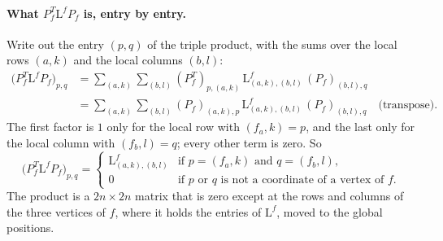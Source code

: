 \paragraph{What $P_f^T\mathrm L^f P_f$ is, entry by entry.} Write out the entry $(p, q)$ of the triple product, with the sums over the local rows $(a, k)$ and the local columns $(b, l)$:
\begin{align*}
\big(P_f^T\mathrm L^f P_f\big)_{p,q} &= \sum_{(a,k)}\sum_{(b,l)} (P_f^T)_{p,(a,k)}\, \mathrm L^f_{(a,k),(b,l)}\, (P_f)_{(b,l),q} \\
&= \sum_{(a,k)}\sum_{(b,l)} (P_f)_{(a,k),p}\, \mathrm L^f_{(a,k),(b,l)}\, (P_f)_{(b,l),q} \quad \text{(transpose)} .
\end{align*}
The first factor is $1$ only for the local row with $(f_a, k) = p$, and the last only for the local column with $(f_b, l) = q$; every other term is zero. So
\begin{equation*}
\big(P_f^T\mathrm L^f P_f\big)_{p,q} = \begin{cases} \mathrm L^f_{(a,k),(b,l)} & \text{if } p = (f_a, k) \text{ and } q = (f_b, l), \\ 0 & \text{if } p \text{ or } q \text{ is not a coordinate of a vertex of } f .\end{cases}
\end{equation*}
The product is a $2n\times 2n$ matrix that is zero except at the rows and columns of the three vertices of $f$, where it holds the entries of $\mathrm L^f$, moved to the global positions.

